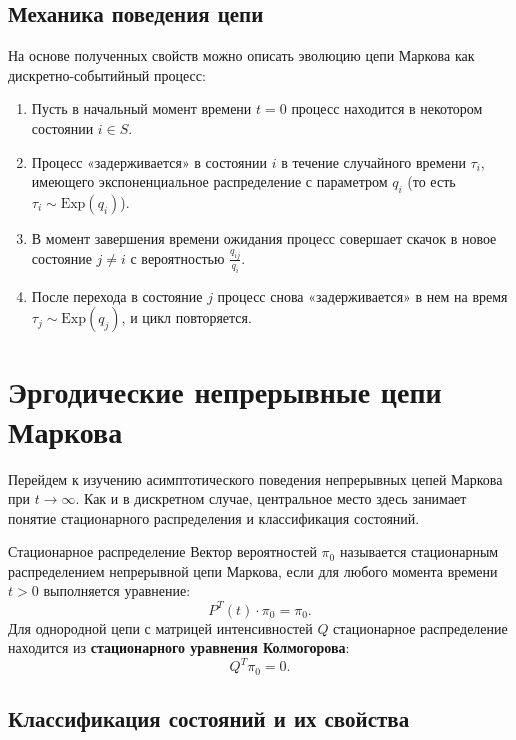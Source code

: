 \subsection*{Механика поведения цепи}

На основе полученных свойств можно описать эволюцию цепи Маркова как дискретно-событийный процесс:
\begin{enumerate}
    \item Пусть в начальный момент времени $t=0$ процесс находится в некотором состоянии $i \in S$.
    \item Процесс «задерживается» в состоянии $i$ в течение случайного времени $\tau_i$, имеющего экспоненциальное распределение с параметром $q_i$ (то есть $\tau_i \sim \text{Exp}(q_i)$).
    \item В момент завершения времени ожидания процесс совершает скачок в новое состояние $j \neq i$ с вероятностью $\frac{q_{ij}}{q_i}$.
    \item После перехода в состояние $j$ процесс снова «задерживается» в нем на время $\tau_j \sim \text{Exp}(q_j)$, и цикл повторяется.
\end{enumerate}

\section{Эргодические непрерывные цепи Маркова}

Перейдем к изучению асимптотического поведения непрерывных цепей Маркова при $t \to \infty$. Как и в дискретном случае, центральное место здесь занимает понятие стационарного распределения и классификация состояний.

\begin{definition}{Стационарное распределение}
    Вектор вероятностей $\pi_0$ называется стационарным распределением непрерывной цепи Маркова, если для любого момента времени $t > 0$ выполняется уравнение:
    \begin{equation}
        P^T(t) \cdot \pi_0 = \pi_0.
    \end{equation}
    Для однородной цепи с матрицей интенсивностей $Q$ стационарное распределение находится из \textbf{стационарного уравнения Колмогорова}:
    \begin{equation}
        \boxed{Q^T \pi_0 = 0}.
    \end{equation}
\end{definition}

\subsection{Классификация состояний и их свойства}

